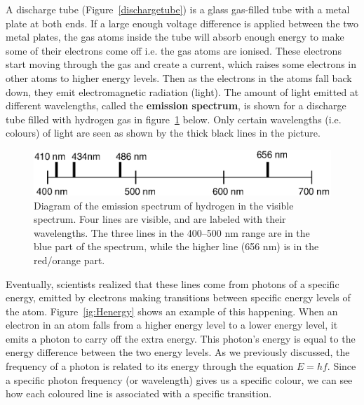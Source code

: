 A discharge tube (Figure~\ref{dischargetube}) is a glass gas-filled tube with a metal plate at both ends. If a large enough voltage difference is applied between the two metal plates, the gas atoms inside the tube will absorb enough energy to make some of their electrons come off i.e. the gas atoms are ionised. These electrons start moving through the gas and create a current, which raises some electrons in other atoms to higher energy levels. Then as the electrons in the atoms fall back down, they emit electromagnetic radiation (light). The amount of light emitted at different wavelengths, called the \textbf{emission spectrum}, is shown for a discharge tube filled with hydrogen gas in figure~\ref{hydrogenspectrum} below. Only certain wavelengths (i.e. colours) of light are seen as shown by the thick black lines in the picture.

\begin{figure}[H]
\begin{center}
\includegraphics[width=4.5in]{../../epsimages/hydrogen_emission_spectrum.eps}
\end{center}
\caption{Diagram of the emission spectrum of hydrogen in the visible spectrum.  Four lines are visible, and are labeled with their wavelengths.  The three lines in the 400--500 nm range are in the blue part of the spectrum, while the higher line (656 nm) is in the red/orange part.}
\label{hydrogenspectrum}
\end{figure}

Eventually, scientists realized that these lines come from photons of a specific energy, emitted by electrons making transitions between specific energy levels of the atom.  Figure~\ref{ig:Henergy} shows an example of this happening.  When an electron in an atom falls from a higher energy level to a lower energy level, it emits a photon to carry off the extra energy.  This photon's energy is equal to the energy difference between the two energy levels.  As we previously discussed, the frequency of a photon is related to its energy through the equation $E=hf$.  Since a specific photon frequency (or wavelength) gives us a specific colour, we can see how each coloured line is associated with a specific transition. 
 

